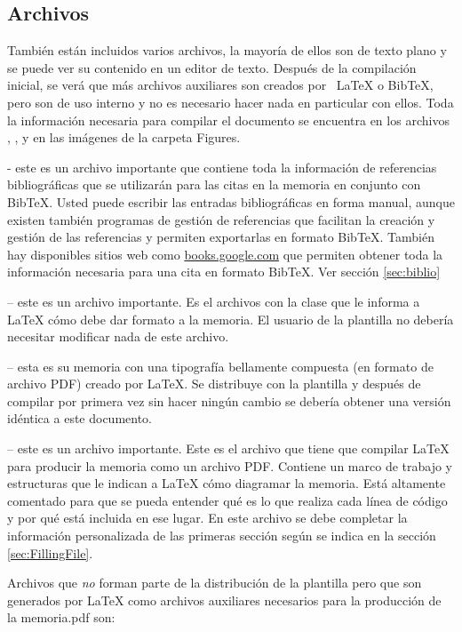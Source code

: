 \subsection{Archivos}

También están incluidos varios archivos, la mayoría de ellos son de texto plano y se puede ver su contenido en un editor de texto. Después de la compilación inicial, se verá que más archivos auxiliares son creados por \ LaTeX{} o BibTeX, pero son de uso interno y no es necesario hacer nada en particular con ellos.  Toda la información necesaria para compilar el documento se encuentra en los archivos , ,  y en las imágenes de la carpeta Figures.

 - este es un archivo importante que contiene toda la información de referencias bibliográficas que se utilizarán para las citas en la memoria en conjunto con BibTeX. Usted puede escribir las entradas bibliográficas en forma manual, aunque existen también programas de gestión de referencias que facilitan la creación y gestión de las referencias y permiten exportarlas en formato BibTeX.  También hay disponibles sitios web como \url{books.google.com} que permiten obtener toda la información necesaria para una cita en formato BibTeX. Ver sección \ref{sec:biblio}

 -- este es un archivo importante. Es el archivos con la clase que le informa a \LaTeX{} cómo debe dar formato a la memoria. El usuario de la plantilla no debería necesitar modificar nada de este archivo.

 -- esta es su memoria con una tipografía bellamente compuesta (en formato de archivo PDF) creado por \LaTeX{}. Se distribuye con la plantilla y después de compilar por primera vez sin hacer ningún cambio se debería obtener una versión idéntica a este documento.

 -- este es un archivo importante. Este es el archivo que tiene que compilar \LaTeX{} para producir la memoria como un archivo PDF. Contiene un marco de trabajo y estructuras que le indican a \LaTeX{} cómo diagramar la memoria.  Está altamente comentado para que se pueda entender qué es lo que realiza cada línea de código y por qué está incluida en ese lugar.  En este archivo se debe completar la información personalizada de las primeras sección según se indica en la sección \ref{sec:FillingFile}.

Archivos que \emph{no} forman parte de la distribución de la plantilla pero que son generados por \LaTeX{} como archivos auxiliares necesarios para la producción de la memoria.pdf son:

